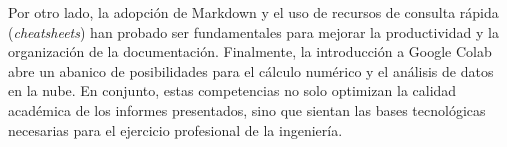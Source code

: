 \documentclass[runningheads]{llncs}
\begin{document}
Por otro lado, la adopción de Markdown y el uso de recursos de consulta rápida (\textit{cheatsheets}) han probado ser fundamentales para mejorar la productividad y la organización de la documentación. Finalmente, la introducción a Google Colab abre un abanico de posibilidades para el cálculo numérico y el análisis de datos en la nube. En conjunto, estas competencias no solo optimizan la calidad académica de los informes presentados, sino que sientan las bases tecnológicas necesarias para el ejercicio profesional de la ingeniería.
\end{document}

